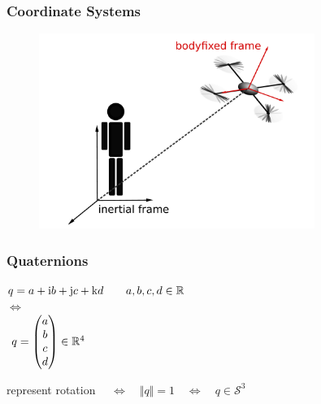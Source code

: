 
\begin{frame}
	\frametitle{Coordinate Systems}
		\begin{figure}[p]
			\centering
			\includegraphics[width=0.8\textwidth]{images/Koordinatensysteme.pdf}
			\label{fig:Koordinatensysteme}
	\end{figure}
\end{frame}


\begin{frame}
	\frametitle{Quaternions}
	\begin{block}{}
		\centering
		\( q = a + \textup{i}b+\textup{j}c+\textup{k}d \qquad a, b, c, d \in \mathbb{R} \) \\
		\vspace{.5ex}
		\(\Leftrightarrow\) \\
		\vspace{1ex}
		\( \hspace{1ex} q = \begin{pmatrix} a \\ b \\ c\\ d \end{pmatrix} \in \mathbb{R}^4 \)
	\end{block}
	
	\vspace{1em}
			 \centering
			represent rotation \( \quad \Leftrightarrow \quad \Vert q \Vert = 1 \quad \Leftrightarrow \quad q \in \mathcal{S}^3\) 
\end{frame}

